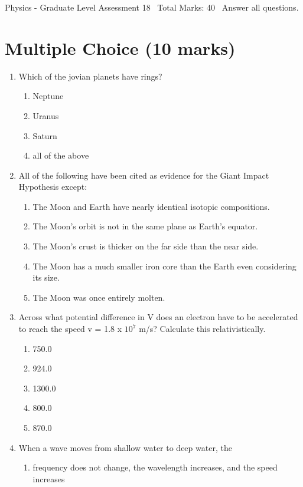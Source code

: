 \documentclass[12pt]{article}
\begin{document}
\begin{center}
Physics - Graduate Level Assessment 18 \
Total Marks: 40 \
Answer all questions.
\end{center}

\section*{Multiple Choice (10 marks)}
\begin{enumerate}[label=\arabic*.]
\item Which of the jovian planets have rings?
\begin{enumerate}[label=(\alph*)]
    \item Neptune
    \item Uranus
    \item Saturn
    \item all of the above
\end{enumerate}
\item All of the following have been cited as evidence for the Giant Impact Hypothesis except:
\begin{enumerate}[label=(\alph*)]
    \item The Moon and Earth have nearly identical isotopic compositions.
    \item The Moon's orbit is not in the same plane as Earth's equator.
    \item The Moon's crust is thicker on the far side than the near side.
    \item The Moon has a much smaller iron core than the Earth even considering its size.
    \item The Moon was once entirely molten.
\end{enumerate}
\item Across what potential difference in V does an electron have to be accelerated to reach the speed v = 1.8 x $10^7$ m/s? Calculate this relativistically.
\begin{enumerate}[label=(\alph*)]
    \item 750.0
    \item 924.0
    \item 1300.0
    \item 800.0
    \item 870.0
\end{enumerate}
\item When a wave moves from shallow water to deep water, the
\begin{enumerate}[label=(\alph*)]
    \item frequency does not change, the wavelength increases, and the speed increases

\end{enumerate}
\end{enumerate}
\end{document}
